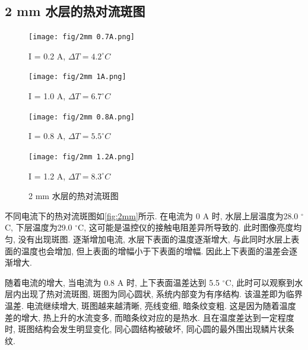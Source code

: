\documentclass[font=default]{mpltx}
\begin{document}
  \subsection{2 mm 水层的热对流斑图}
    \begin{figure}[htbp]      
      \begin{minipage}{0.32\linewidth}
        \vspace{3pt}
        \centerline{\texttt{[image: fig/2mm 0.7A.png]}}
        \centerline{I = 0.2 A, $\Delta T = 4.2^\circ C$}
        \vspace{3pt}
        \centerline{\texttt{[image: fig/2mm 1A.png]}}
        \centerline{I = 1.0 A, $\Delta T = 6.7^\circ C$}
      \end{minipage}
      \begin{minipage}{0.32\linewidth}
        \vspace{3pt}
        \centerline{\texttt{[image: fig/2mm 0.8A.png]}}
        \centerline{I = 0.8 A, $\Delta T = 5.5^\circ C$}
        \vspace{3pt}
        \centerline{\texttt{[image: fig/2mm 1.2A.png]}}
        \centerline{I = 1.2 A, $\Delta T = 8.3^\circ C$}
      \end{minipage}
      \caption{2 mm 水层的热对流斑图}
      \label{fig:2mm}
    \end{figure}
  不同电流下的热对流斑图如\autoref{fig:2mm}所示.
  在电流为 0 A 时, 水层上层温度为28.0 $^\circ$C, 下层温度为29.0 $^\circ$C, 这可能是温控仪的接触电阻差异所导致的. 此时图像亮度均匀, 没有出现斑图.
  逐渐增加电流, 水层下表面的温度逐渐增大, 与此同时水层上表面的温度也会增加, 但上表面的增幅小于下表面的增幅. 因此上下表面的温差会逐渐增大.
  \par
  随着电流的增大, 当电流为 0.8 A 时, 上下表面温差达到 5.5 $^\circ$C, 此时可以观察到水层内出现了热对流斑图, 斑图为同心圆状, 系统内部变为有序结构. 该温差即为临界温差.
  电流继续增大, 斑图越来越清晰, 亮线变细, 暗条纹变粗. 这是因为随着温度差的增大, 热上升的水流变多, 而暗条纹对应的是热水.
  且在温度差达到一定程度时, 斑图结构会发生明显变化, 同心圆结构被破坏, 同心圆的最外围出现鳞片状条纹.
\end{document}
